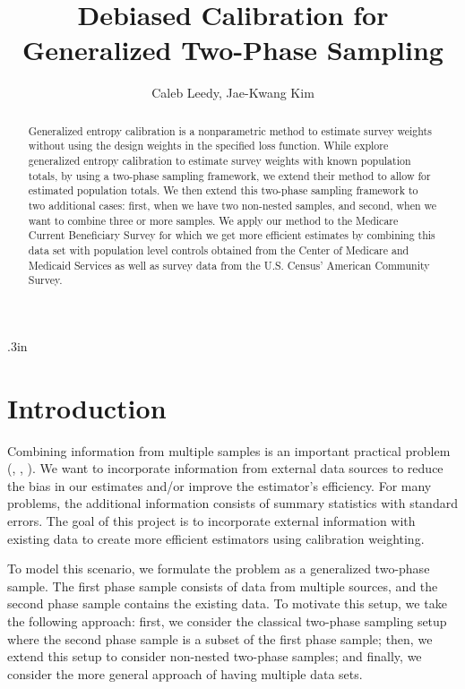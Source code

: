 \documentclass[12pt]{article}
\begin{document}
\title{Debiased Calibration for Generalized Two-Phase Sampling}
\author{Caleb Leedy, Jae-Kwang Kim}
\maketitle 

\baselineskip .3in

\begin{abstract}
Generalized entropy calibration \cite{gneiting2007strictly} is a nonparametric
method to estimate survey weights without using the design weights in the
specified loss function. While \cite{kwon2024debiased} explore generalized
entropy calibration to estimate survey weights with known population totals, by
using a two-phase sampling framework, we extend their method to allow for
estimated population totals. We then extend this two-phase sampling framework to
two additional cases: first, when we have two non-nested samples, and
second, when we want to combine three or more samples. 
We apply our method to the Medicare Current Beneficiary Survey for which we
get more efficient estimates by combining this data set with population level
controls obtained from the Center of Medicare and Medicaid Services as well as
survey data from the U.S. Census' American Community Survey.
\end{abstract}

\section{Introduction}

Combining information from multiple samples is an important practical problem
(\cite{yang2020statistical}, \cite{yang2023elastic}, \cite{dagdoug2023model}).
We want to incorporate information from external data sources to reduce the bias
in our estimates and/or improve the estimator's efficiency. For many problems, the
additional information consists of summary statistics with standard errors. The
goal of this project is to incorporate external information with existing data 
to create more efficient estimators using calibration weighting.

To model this scenario, we formulate the problem as a generalized two-phase
sample. The first phase sample consists of data from multiple sources, and the
second phase sample contains the existing data. To motivate this setup, we
take the following approach: first, we consider the classical two-phase
sampling setup where the second phase sample is a subset of the first phase
sample; then, we extend this setup to consider non-nested two-phase samples;
and finally, we consider the more general approach of having multiple data sets.
\end{document}
